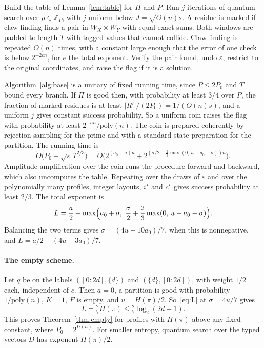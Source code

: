 \documentclass[11pt]{article}
\theoremstyle{remark}
\newcommand{\Ot}{\tilde O}
\begin{document}
\begin{algorithm}[h]
\caption{Base procedure on a coin $(\Pi,P,j)$}\label{alg:base}
\begin{algorithmic}[1]
\State Build the table of Lemma~\ref{lem:table} for $\Pi$ and $P$.
\State Run $j$ iterations of quantum search over $\rho\in\mathbb Z_P$, with $j$ uniform below $J=\sqrt{O(n)s}$. A residue is marked if claw finding finds a pair in $W_X\times W_Y$ with equal exact sums. Both windows are padded to length $T$ with tagged values that cannot collide. Claw finding is repeated $O(n)$ times, with a constant large enough that the error of one check is below $2^{-2en}$, for $e$ the total exponent.
\State Verify the pair found, undo $\varepsilon$, restrict to the original coordinates, and raise the flag if it is a solution.
\end{algorithmic}
\end{algorithm}

Algorithm~\ref{alg:base} is a unitary of fixed running time, since $P\le2P_0$ and $T$ bound every branch. If $\Pi$ is good then, with probability at least $3/4$ over $P$, the fraction of marked residues is at least $|R'|/(2P_0)=1/(O(n)s)$, and a uniform $j$ gives constant success probability. So a uniform coin raises the flag with probability at least $2^{-an}/\mathrm{poly}(n)$. The coin is prepared coherently by rejection sampling for the prime and with a standard state preparation for the partition. The running time is
\[
\Ot\bigl(P_0+\sqrt s\,T^{2/3}\bigr)=\Ot\bigl(2^{(a_0+\sigma)n}+2^{(\sigma/2+\frac23\max(0,\,u-a_0-\sigma))n}\bigr).
\]
Amplitude amplification over the coin runs the procedure forward and backward, which also uncomputes the table. Repeating over the draws of $\varepsilon$ and over the polynomially many profiles, integer layouts, $i^\star$ and $c^\star$ gives success probability at least $2/3$. The total exponent is
\begin{equation}\label{eq:L}
L=\frac a2+\max\Bigl(a_0+\sigma,\ \frac\sigma2+\frac23\max(0,\,u-a_0-\sigma)\Bigr).
\end{equation}
Balancing the two terms gives $\sigma=(4u-10a_0)/7$, when this is nonnegative, and $L=a/2+(4u-3a_0)/7$.

\paragraph{The empty scheme.} Let $q$ be on the labels $([0:2d],\{d\})$ and $(\{d\},[0:2d])$, with weight $1/2$ each, independent of $c$. Then $a=0$, a partition is good with probability $1/\mathrm{poly}(n)$, $K=1$, $F$ is empty, and $u=H(\pi)/2$. So~\eqref{eq:L} at $\sigma=4u/7$ gives
\[
L=\tfrac27H(\pi)\le\tfrac27\log_2(2d+1).
\]
This proves Theorem~\ref{thm:empty} for profiles with $H(\pi)$ above any fixed constant, where $P_0=2^{\Omega(n)}$. For smaller entropy, quantum search over the typed vectors $D$ has exponent $H(\pi)/2$.
\end{document}
